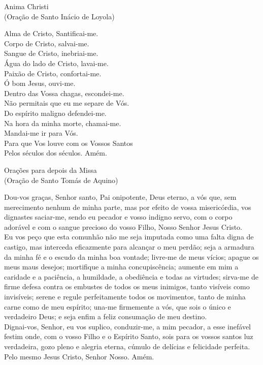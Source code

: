 \documentclass{book}
\begin{document}
\newpage
\begin{center}
    Anima Christi \\ \textcolor{VioletRed2}{\scriptsize{(Oração de Santo Inácio de Loyola)}}
\end{center}
\begin{flushleft}
    Alma de Cristo, Santificai-me. \\
    Corpo de Cristo, salvai-me. \\
    Sangue de Cristo, inebriai-me. \\
    Água do lado de Cristo, lavai-me. \\
    Paixão de Cristo, confortai-me. \\
    Ó bom Jesus, ouvi-me. \\
    Dentro das Vossa chagas, escondei-me. \\
    Não permitais que eu me separe de Vós. \\
    Do espírito maligno defendei-me. \\
    Na hora da minha morte, chamai-me. \\
    Mandai-me ir para Vós. \\
    Para que Vos louve com os Vossos Santos \\
    Pelos séculos dos séculos. Amém.
\end{flushleft}
\begin{center}
    Orações para depois da Missa \\ \textcolor{VioletRed2}{\scriptsize{(Oração de Santo Tomás de Aquino)}}
\end{center}
\begin{flushleft}
    Dou-vos graças, Senhor santo, Pai onipotente, Deus eterno, a vós que, sem merecimento nenhum de minha parte, mas por efeito de vossa misericórdia, vos dignastes saciar-me, sendo eu pecador e vosso indigno servo, com o corpo adorável e com o sangue precioso do vosso Filho, Nosso Senhor Jesus Cristo.
    \vspace{.2cm} \\
    Eu vos peço que esta comunhão não me seja imputada como uma falta digna de castigo, mas interceda eficazmente para alcançar o meu perdão; seja a armadura da minha fé e o escudo da minha boa vontade; livre-me de meus vícios; apague os meus maus desejos; mortifique a minha concupiscência; aumente em mim a caridade e a paciência, a humildade, a obediência e todas as virtudes; sirva-me de firme defesa contra os embustes de todos os meus inimigos, tanto visíveis como invisíveis; serene e regule perfeitamente todos os movimentos, tanto de minha carne como de meu espírito; una-me firmemente a vós, que sois o único e verdadeiro Deus; e seja enfim a feliz consumação de meu destino.
    \vspace{.2cm} \\
    Dignai-vos, Senhor, eu vos suplico, conduzir-me, a mim pecador, a esse inefável festim onde, com o vosso Filho e o Espírito Santo, sois para os vossos santos luz verdadeira, gozo pleno e alegria eterna, cúmulo de delícias e felicidade perfeita. Pelo mesmo Jesus Cristo, Senhor Nosso. Amém.
\end{flushleft}
\end{document}
